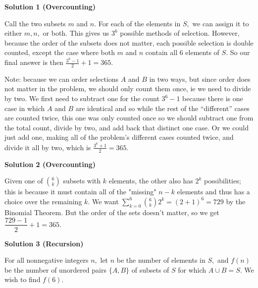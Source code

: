 \begin{enumerate}
\textbf{Solution 1 (Overcounting)}

Call the two subsets $m$ and $n.$ For each of the elements in $S,$ we can assign it to either $m,n,$ or both. This gives us $3^6$ possible methods of selection. However, because the order of the subsets does not matter, each possible selection is double counted, except the case where both $m$ and $n$ contain all $6$ elements of $S.$ So our final answer is then $\frac {3^6 - 1}{2} + 1 = \boxed{365}.$

 Note: because we can order selections $A$ and $B$ in two ways, but since order does not matter in the problem, we should only count them once, ie we need to divide by two. We first need to subtract one for the count $3^6-1$ because there is one case in which $A$ and $B$ are identical and so while the rest of the “different” cases are counted twice, this one was only counted once so we should subtract one from the total count, divide by two, and add back that distinct one case. Or we could just add one, making all of the problem’s different cases counted twice, and divide it all by two, which is $\frac{3^6+1}{2}=365.$




\textbf{Solution 2 (Overcounting)}

Given one of ${6 \choose k}$ subsets with $k$ elements, the other also has $2^k$ possibilities; this is because it must contain all of the "missing" $n - k$ elements and thus has a choice over the remaining $k.$ We want $\sum_{k = 0}^6 {6 \choose k}2^k = (2 + 1)^6 = 729$ by the Binomial Theorem. But the order of the sets doesn't matter, so we get $\dfrac{729 - 1}{2} + 1 = \boxed{365}.$




\textbf{Solution 3 (Recursion)}

For all nonnegative integers $n,$ let $n$ be the number of elements in $S,$ and $f(n)$ be the number of unordered pairs $\{A,B\}$ of subsets of $S$ for which $A\cup B=S.$ We wish to find $f(6).$


\end{enumerate}
